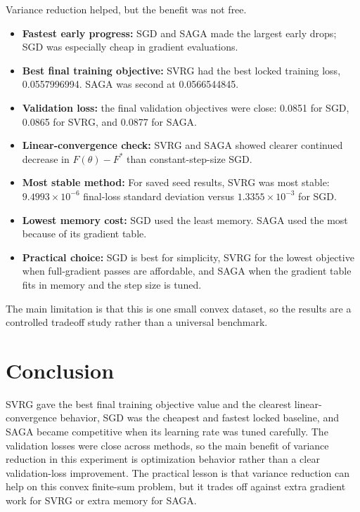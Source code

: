 \documentclass{article}
\begin{document}
Variance reduction helped, but the benefit was not free.
\begin{itemize}
    \item \textbf{Fastest early progress:} SGD and SAGA made the largest early
    drops; SGD was especially cheap in gradient evaluations.
    \item \textbf{Best final training objective:} SVRG had the best locked
    training loss, 0.0557996994. SAGA was second at 0.0566544845.
    \item \textbf{Validation loss:} the final validation objectives were close:
    0.0851 for SGD, 0.0865 for SVRG, and 0.0877 for SAGA.
    \item \textbf{Linear-convergence check:} SVRG and SAGA showed clearer
    continued decrease in $F(\theta)-F^*$ than constant-step-size SGD.
    \item \textbf{Most stable method:} For saved seed results, SVRG was most
    stable: $9.4993 \times 10^{-6}$ final-loss standard deviation versus
    $1.3355 \times 10^{-3}$ for SGD.
    \item \textbf{Lowest memory cost:} SGD used the least memory. SAGA used the
    most because of its gradient table.
    \item \textbf{Practical choice:} SGD is best for simplicity, SVRG for the
    lowest objective when full-gradient passes are affordable, and SAGA when the
    gradient table fits in memory and the step size is tuned.
\end{itemize}
The main limitation is that this is one small convex dataset, so the results
are a controlled tradeoff study rather than a universal benchmark.

\section{Conclusion}

SVRG gave the best final training objective value and the clearest
linear-convergence behavior, SGD was the cheapest and fastest locked baseline,
and SAGA became competitive when its learning rate was tuned carefully. The
validation losses were close across methods, so the main benefit of variance
reduction in this experiment is optimization behavior rather than a clear
validation-loss improvement. The practical lesson is that variance reduction can
help on this convex finite-sum problem, but it trades off against extra gradient
work for SVRG or extra memory for SAGA.
\end{document}
